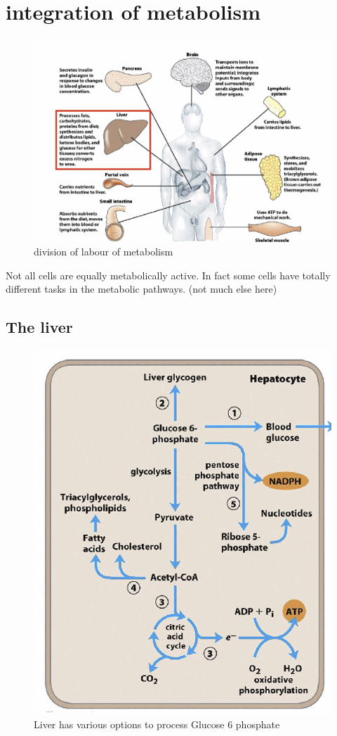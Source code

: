 \documentclass[../main.tex]{subfiles}
\begin{document}
\section{integration of metabolism}
\begin{figure}[H]
    \centering
    \includegraphics[width=\linewidth]{divisionLabour.png}
    \caption{division of labour of metabolism}
    \label{fig:enter-label}
\end{figure}
Not all cells are equally metabolically active. In fact some cells have totally different tasks in the metabolic pathways. 
(not much else here)

\subsection{The liver}
\begin{figure}[H]
    \centering
    \includegraphics[width=0.5\linewidth]{Liver.png}
    \caption{Liver has various options to process Glucose 6 phosphate}
    \label{fig:enter-label}
\end{figure}
\end{document}
